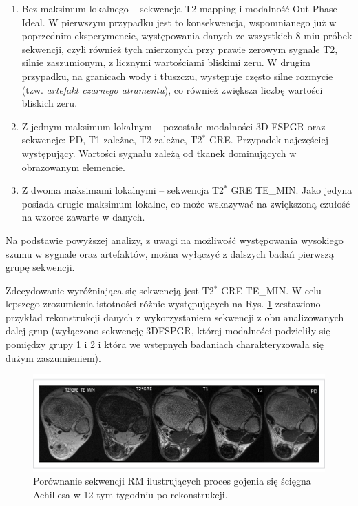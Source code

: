 \begin{enumerate}
	\item Bez maksimum lokalnego -- sekwencja T2 mapping i modalność Out Phase Ideal. W pierwszym przypadku jest to konsekwencja, wspomnianego już w poprzednim eksperymencie, występowania danych ze wszystkich 8-miu próbek sekwencji, czyli również tych mierzonych przy prawie zerowym sygnale T2, silnie zaszumionym, z licznymi wartościami bliskimi zeru. W drugim przypadku, na granicach wody i tłuszczu, występuje często silne rozmycie (tzw. \textit{artefakt czarnego atramentu}), co również zwiększa liczbę wartości bliskich zeru.
	\item Z jednym maksimum lokalnym -- pozostałe modalności 3D FSPGR oraz sekwencje: PD, T1 zależne, T2 zależne, T2$^\ast$ GRE. Przypadek najczęściej występujący. Wartości sygnału zależą od tkanek dominujących w obrazowanym elemencie.
	\item Z dwoma maksimami lokalnymi -- sekwencja T2$^\ast$ GRE TE\_MIN. Jako jedyna posiada drugie maksimum lokalne, co może wskazywać na zwiększoną czułość na wzorce zawarte w danych.  
	
\end{enumerate}
Na podstawie powyższej analizy, z uwagi na możliwość występowania wysokiego szumu w sygnale oraz artefaktów, można wyłączyć z dalszych badań pierwszą grupę sekwencji. 

Zdecydowanie wyróżniająca się sekwencją jest T2$^\ast$ GRE TE\_MIN. W celu lepszego zrozumienia istotności różnic występujących na Rys. \ref{fig:protocol_comp} zestawiono przykład rekonstrukcji danych z wykorzystaniem sekwencji z obu analizowanych dalej grup (wyłączono sekwencję 3DFSPGR, której modalności podzieliły się pomiędzy grupy 1 i 2 i która we wstępnych badaniach charakteryzowała się dużym zaszumieniem). 

 \begin{figure}[h]
 	\centering
 	\includegraphics[width=1\textwidth]{figures/Protocol_comparison.jpg}
 	\caption{Porównanie sekwencji RM ilustrujących proces gojenia się ścięgna Achillesa w 12-tym tygodniu po rekonstrukcji.}\label{fig:protocol_comp}
 \end{figure}

